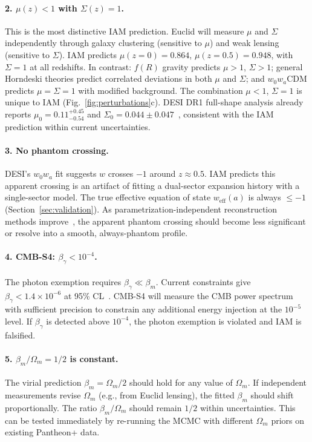 \documentclass[aps,prd,twocolumn,superscriptaddress,nofootinbib]{revtex4-2}
\begin{document}
\paragraph{2. $\mu(z) < 1$ with $\Sigma(z) = 1$.}
This is the most distinctive IAM prediction. Euclid will measure $\mu$ and $\Sigma$ independently through galaxy clustering (sensitive to $\mu$) and weak lensing (sensitive to $\Sigma$). IAM predicts $\mu(z=0) = 0.864$, $\mu(z=0.5) = 0.948$, with $\Sigma = 1$ at all redshifts. In contrast: $f(R)$ gravity predicts $\mu > 1$, $\Sigma > 1$; general Horndeski theories predict correlated deviations in both $\mu$ and $\Sigma$; and $w_0w_a$CDM predicts $\mu = \Sigma = 1$ with modified background. The combination $\mu < 1$, $\Sigma = 1$ is unique to IAM (Fig.~\ref{fig:perturbations}c). DESI DR1 full-shape analysis already reports $\mu_0 = 0.11^{+0.45}_{-0.54}$ and $\Sigma_0 = 0.044 \pm 0.047$~\cite{DESIDR1FS}, consistent with the IAM prediction within current uncertainties.

\paragraph{3. No phantom crossing.}
DESI's $w_0w_a$ fit suggests $w$ crosses $-1$ around $z \approx 0.5$. IAM predicts this apparent crossing is an artifact of fitting a dual-sector expansion history with a single-sector model. The true effective equation of state $w_\text{eff}(a)$ is always $\leq -1$ (Section~\ref{sec:validation}). As parametrization-independent reconstruction methods improve~\cite{DESI2025DR2}, the apparent phantom crossing should become less significant or resolve into a smooth, always-phantom profile.

\paragraph{4. CMB-S4: $\beta_\gamma < 10^{-4}$.}
The photon exemption requires $\beta_\gamma \ll \beta_m$. Current constraints give $\beta_\gamma < 1.4 \times 10^{-6}$ at 95\% CL~\cite{Mahaffey2026compendium}. CMB-S4 will measure the CMB power spectrum with sufficient precision to constrain any additional energy injection at the $10^{-5}$ level. If $\beta_\gamma$ is detected above $10^{-4}$, the photon exemption is violated and IAM is falsified.

\paragraph{5. $\beta_m/\Omega_m = 1/2$ is constant.}
The virial prediction $\beta_m = \Omega_m/2$ should hold for any value of $\Omega_m$. If independent measurements revise $\Omega_m$ (e.g., from Euclid lensing), the fitted $\beta_m$ should shift proportionally. The ratio $\beta_m/\Omega_m$ should remain $1/2$ within uncertainties. This can be tested immediately by re-running the MCMC with different $\Omega_m$ priors on existing Pantheon+ data.
\end{document}
